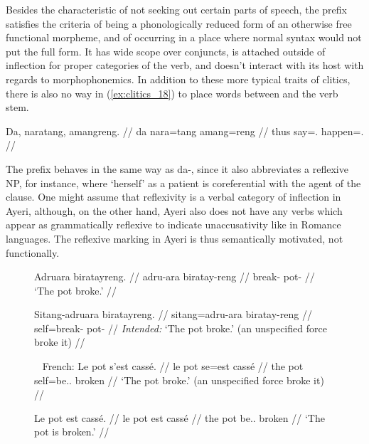 Besides the characteristic of not seeking out certain parts of speech, the
 prefix satisfies the criteria of being a phonologically reduced
form of an otherwise free functional morpheme, and of occurring in a place
where normal syntax would not put the full form. It has wide scope over
conjuncts, is attached outside of inflection for proper categories of the verb,
and doesn't interact with its host with regards to morphophonemics. In addition
to these more typical traits of clitics, there is also no way in
(\ref{ex:clitics_18}) to place words between  and the verb stem.

\ex\label{ex:clitics_18}\begingl
	\gla Da, naratang, amangreng. //
	\glb da nara=tang amang=reng //
	\glc thus say=\TplM{}.\Aarg{} happen=\TsgI{}.\Aarg{} //
\endgl\xe

\label{clitics_preverb_refl}
The prefix  behaves in the same way as 
{da-}, since it also abbreviates a reflexive NP, for instance,
 where `herself' as a patient is
coreferential with the agent of the clause. One might assume that reflexivity
is a verbal category of inflection in Ayeri, although, on the other hand, Ayeri
also does not have any verbs which appear as grammatically reflexive to
indicate unaccusativity like in Romance languages. The reflexive marking in
Ayeri is thus semantically motivated, not functionally.

\begin{figure}[h]
\pex\label{ex:clitics_19}
\a\label{ex:clitics_19a}\begingl
	\gla Adruara biratayreng. //
	\glb adru-ara biratay-reng //
	\glc break-\TsgI{} pot-\AargI{} //
	\glft `The pot broke.' //
\endgl

\a\label{ex:clitics_19b}\ljudge{*}\begingl
	\gla Sitang-adruara biratayreng. //
	\glb sitang=adru-ara biratay-reng //
	\glc self=break-\TsgI{} pot-\AargI{} //
	\glft \textit{Intended:} `The pot broke.' (an unspecified force broke 
		it) //
\endgl
\xe
\end{figure}

\begin{figure}[h]
\pex~\label{ex:clitics_20}%
French:
\a\label{ex:clitics_20a}\begingl
	\gla Le pot s'est cassé. //
	\glb le pot se=est cassé //
	\glc the pot self=be.\Tsg{}.\Prs{} broken //
	\glft `The pot broke.' (an unspecified force broke it) //
\endgl

\a\label{ex:clitics_20b}\begingl
	\gla Le pot est cassé. //
	\glb le pot est cassé //
	\glc the pot be.\Tsg{}.\Prs{} broken //
	\glft `The pot is broken.' //
\endgl
\xe
\end{figure}

